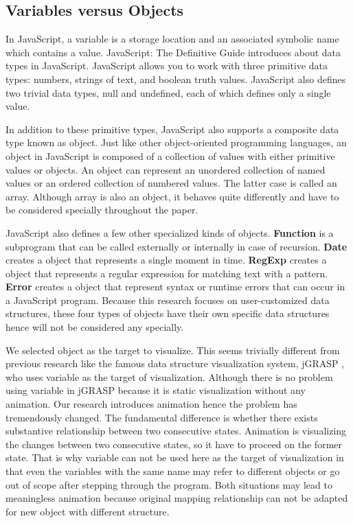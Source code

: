 \subsection {Variables versus Objects}
In JavaScript, a variable is a storage location and an associated symbolic name which contains a value. JavaScript: The Definitive Guide \cite{Flanagan:1998:JDG:551216} introduces about data types in JavaScript. JavaScript allows you to work with three primitive data types: numbers, strings of text, and boolean truth values. JavaScript also defines two trivial data types, null and undefined, each of which defines only a single value.

In addition to these primitive types, JavaScript also supports a composite data type known as object. Just like other object-oriented programming languages, an object in JavaScript is composed of a collection of values with either primitive values or objects. An object can represent an unordered collection of named values or an ordered collection of numbered values. The latter case is called an array. Although array is also an object, it behaves quite differently and have to be considered specially throughout the paper.

JavaScript also defines a few other specialized kinds of objects. \textbf{Function} is a subprogram that can be called externally or internally in case of recursion. \textbf{Date} creates a object that represents a single moment in time. \textbf{RegExp} creates a object that represents a regular expression for matching text with a pattern. \textbf{Error} creates a object that represent syntax or runtime errors that can occur in a JavaScript program. Because this research focuses on user-customized data structures, these four types of objects have their own specific data structures hence will not be considered any specially.

We selected object as the target to visualize. This seems trivially different from previous research like the famous data structure visualization system, jGRASP \cite{Cross:2007:DOV:1227310.1227316}, who uses variable as the target of visualization. Although there is no problem using variable in jGRASP because it is static visualization without any animation. Our research introduces animation hence the problem has tremendously changed. The fundamental difference is whether there exists substantive relationship between two consecutive states. Animation is visualizing the changes between two consecutive states, so it have to proceed on the former state. That is why variable can not be used here as the target of visualization in that even the variables with the same name may refer to different objects or go out of scope after stepping through the program. Both situations may lead to meaningless animation because original mapping relationship can not be adapted for new object with different structure.

